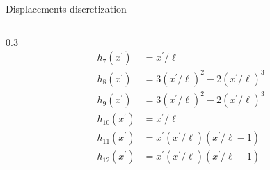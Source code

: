 \documentclass[aspectratio=169]{beamer}
\begin{document}
\begin{frame}{Displacements discretization}
\begin{columns}
    \begin{column}{0.3\textwidth}
      \tiny  \begin{align*}
        h_7(x^\prime)    & = x^\prime/\ell                           \\
        h_8(x^\prime)    & =3(x^\prime/\ell)^2-2(x^\prime/\ell)^3    \\
        h_9(x^\prime)    & =3(x^\prime/\ell)^2-2(x^\prime/\ell)^3    \\
        h_{10}(x^\prime) & = x^\prime/\ell                           \\
        h_{11}(x^\prime) & =x^\prime(x^\prime/\ell)(x^\prime/\ell-1) \\
        h_{12}(x^\prime) & =x^\prime(x^\prime/\ell)(x^\prime/\ell-1)
      \end{align*}
    \end{column}
  \end{columns}
\end{frame}
\end{document}
